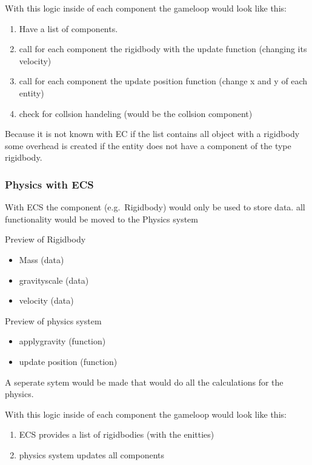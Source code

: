 \documentclass{projdoc}
\begin{document}
With this logic inside of each component the gameloop would look like this:

\begin{enumerate}[label={step \arabic*:},leftmargin=5em]
	\item Have a list of components.
	\item call for each component the rigidbody with the update function (changing its
		velocity)
	\item call for each component the update position function (change x and y of each
		entity)
	\item check for collsion handeling (would be the collsion component)
\end{enumerate}

Because it is not known with EC if the list contains all object with a rigidbody some
overhead is created if the entity does not have a component of the type rigidbody.

\subsubsection{Physics with ECS}

With ECS the component (e.g.~Rigidbody) would only be used to store data. all
functionality would be moved to the Physics system

Preview of Rigidbody
\begin{itemize}
	\item Mass (data)
	\item gravityscale (data)
	\item velocity (data)
\end{itemize}

Preview of physics system
\begin{itemize}
	\item applygravity (function)
	\item update position (function)
\end{itemize}

A seperate sytem would be made that would do all the calculations for the physics.

With this logic inside of each component the gameloop would look like
this:\noparbreak
\begin{enumerate}[label={Step(\arabic*):},leftmargin=5em]
	\item ECS provides a list of rigidbodies (with the enitties)
	\item physics system updates all components
\end{enumerate}
\end{document}
